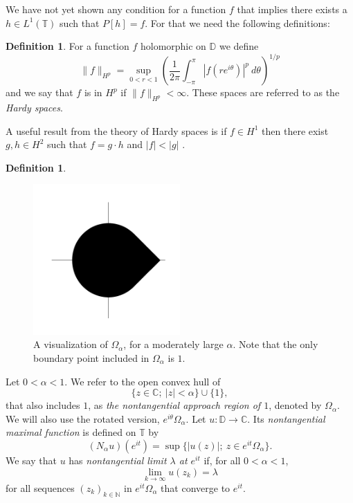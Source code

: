 \documentclass[a4paper,12pt,twoside,BCOR=10mm]{scrbook}
\theoremstyle{definition}
\theoremstyle{definition}
\theoremstyle{definition}
\newtheorem{definition}[theorem]{Definition}
\begin{document}
We have not yet shown any condition for a function $f$ that implies there exists a $h \in L^1(\mathbb{T})$ such that $P[h] = f$.
For that we need the following definitions:
\begin{definition}
For a function $f$ holomorphic on $\mathbb{D}$ we define
\[
	\|f\|_{H^p} = 
	\sup_{0 < r < 1} \left ( \frac{1}{2\pi}\int_{-\pi}^{\pi} |f(re^{i\theta})|^p\ d\theta \right )^{1/p}
\]
and we say that $f$ is in $H^p$ if $\|f\|_{H^p} < \infty$.
These spaces are referred to as the \emph{Hardy spaces}.
\end{definition}
A useful result from the theory of Hardy spaces is if $f \in H^1$ then there exist $g, h \in H^2$ such that $f = g \cdot h$ and $|f| < |g|$ \citep[Theorem $17.10$]{rudin2}.
\begin{definition}
\begin{figure}[h]
\centering
\includegraphics[width=0.5\textwidth]{approach-region-7}
\caption{A visualization of $\Omega_{\alpha}$, for a moderately large $\alpha$. Note that the only boundary point included in $\Omega_{\alpha}$ is $1$. }
\end{figure}
Let $0 < \alpha < 1$.
We refer to the open convex hull of
\[
	\{z \in \mathbb{C};\ |z| < \alpha\} \cup \{1\},
\]
that also includes $1$, as \emph{the nontangential approach region of $1$}, denoted by $\Omega_{\alpha}$.
We will also use the rotated version, $e^{i\theta}\Omega_{\alpha}$.
Let $u: \mathbb{D} \rightarrow \mathbb{C}$.
Its \emph{nontangential maximal function} is defined on $\mathbb{T}$ by
\[
	(N_{\alpha}u)(e^{it}) = \sup \{|u(z)|;\ z \in e^{it}\Omega_{\alpha}\}.
\]
We say that $u$ has \emph{nontangential limit $\lambda$ at $e^{it}$} if, for all $0 < \alpha < 1$,
\[
	\lim_{k \rightarrow \infty} u(z_k) = \lambda
\]
for all sequences $(z_k)_{k \in \mathbb{N}}$ in $e^{it}\Omega_{\alpha}$ that converge to $e^{it}$.
\end{definition}
\end{document}
